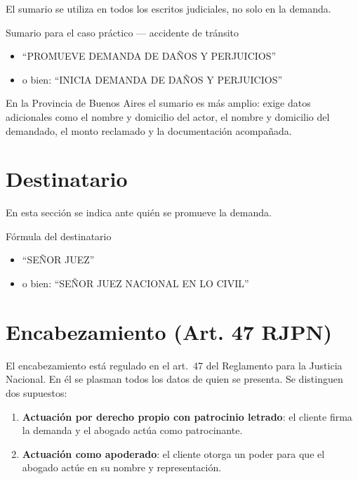 \documentclass[12pt,oneside]{book}
\begin{document}
El sumario se utiliza en todos los escritos judiciales, no solo en la demanda.

\begin{example}{Sumario para el caso práctico — accidente de tránsito}
\begin{itemize}
    \item ``PROMUEVE DEMANDA DE DAÑOS Y PERJUICIOS''
    \item o bien: ``INICIA DEMANDA DE DAÑOS Y PERJUICIOS''
\end{itemize}
\end{example}

\begin{note}
En la Provincia de Buenos Aires el sumario es más amplio: exige datos adicionales como el nombre y domicilio del actor, el nombre y domicilio del demandado, el monto reclamado y la documentación acompañada.
\end{note}

\section{Destinatario}

En esta sección se indica ante quién se promueve la demanda.

\begin{example}{Fórmula del destinatario}
\begin{itemize}
    \item ``SEÑOR JUEZ''
    \item o bien: ``SEÑOR JUEZ NACIONAL EN LO CIVIL''
\end{itemize}
\end{example}

\section{Encabezamiento (Art. 47 RJPN)}

El encabezamiento está regulado en el art.\ 47 del Reglamento para la Justicia Nacional. En él se plasman todos los datos de quien se presenta. Se distinguen dos supuestos:

\begin{enumerate}[label=\alph*)]
    \item \textbf{Actuación por derecho propio con patrocinio letrado}: el cliente firma la demanda y el abogado actúa como patrocinante.
    \item \textbf{Actuación como apoderado}: el cliente otorga un poder para que el abogado actúe en su nombre y representación.
\end{enumerate}
\end{document}
